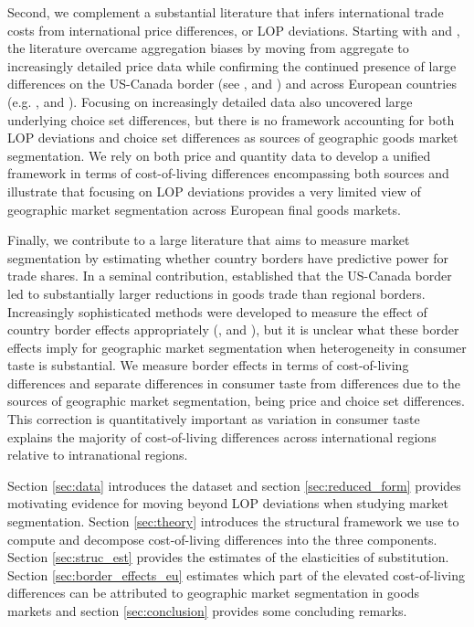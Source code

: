 Second, we complement a substantial literature that infers international trade costs from international price differences, or LOP deviations. Starting with \citet{Engel1996} and \citet{Goldberg1997}, the literature overcame aggregation biases by moving from aggregate to increasingly detailed price data while confirming the continued presence of large differences on the US-Canada border (see \citet{Broda2008}, \citet{Gorodnichenko2009} and \citet{Gopinath2011}) and across European countries (e.g. \citet{Cavallo2014}, \citet{Fontaine2020} and \citet{Beck2020}). Focusing on increasingly detailed data also uncovered large underlying choice set differences, but there is no framework accounting for both LOP deviations and choice set differences as sources of geographic goods market segmentation. We rely on both price and quantity data to develop a unified framework in terms of cost-of-living differences encompassing both sources and illustrate that focusing on LOP deviations provides a very limited view of geographic market segmentation across European final goods markets. 

Finally, we contribute to a large literature that aims to measure market segmentation by estimating whether country borders have predictive power for trade shares. In a seminal contribution, \citet{McCallum1995} established that the US-Canada border led to substantially larger reductions in goods trade than regional borders. Increasingly sophisticated methods were developed to measure the effect of country border effects appropriately (\citet{Anderson2003}, \citet{Helpman2008} and \citet{Santamaria2021}), but it is unclear what these border effects imply for geographic market segmentation when heterogeneity in consumer taste is substantial. We measure border effects in terms of cost-of-living differences and separate differences in consumer taste from differences due to the sources of geographic market segmentation, being price and choice set differences. This correction is quantitatively important as variation in consumer taste explains the majority of cost-of-living differences across international regions relative to intranational regions. 

Section \ref{sec:data} introduces the dataset and section \ref{sec:reduced_form} provides motivating evidence for moving beyond LOP deviations when studying market segmentation. Section \ref{sec:theory} introduces the structural framework we use to compute and decompose cost-of-living differences into the three components. Section \ref{sec:struc_est} provides the estimates of the elasticities of substitution. Section \ref{sec:border_effects_eu} estimates which part of the elevated cost-of-living differences can be attributed to geographic market segmentation in goods markets and section \ref{sec:conclusion} provides some concluding remarks. 
